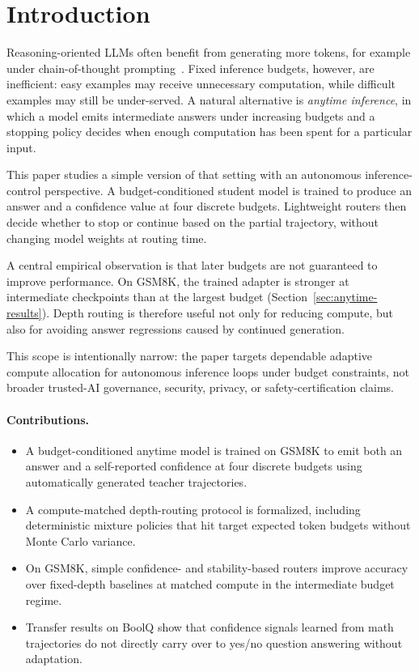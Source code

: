 \documentclass[conference]{IEEEtran}
\begin{document}
\section{Introduction}
Reasoning-oriented LLMs often benefit from generating more tokens, for example under chain-of-thought prompting~\cite{wei2022cot}. Fixed inference budgets, however, are inefficient: easy examples may receive unnecessary computation, while difficult examples may still be under-served. A natural alternative is \emph{anytime inference}, in which a model emits intermediate answers under increasing budgets and a stopping policy decides when enough computation has been spent for a particular input.

This paper studies a simple version of that setting with an autonomous inference-control perspective. A budget-conditioned student model is trained to produce an answer and a confidence value at four discrete budgets. Lightweight routers then decide whether to stop or continue based on the partial trajectory, without changing model weights at routing time.

A central empirical observation is that later budgets are not guaranteed to improve performance. On GSM8K, the trained adapter is stronger at intermediate checkpoints than at the largest budget (Section~\ref{sec:anytime-results}). Depth routing is therefore useful not only for reducing compute, but also for avoiding answer regressions caused by continued generation.

This scope is intentionally narrow: the paper targets dependable adaptive compute allocation for autonomous inference loops under budget constraints, not broader trusted-AI governance, security, privacy, or safety-certification claims.

\paragraph{Contributions.}
\begin{itemize}
  \item A budget-conditioned anytime model is trained on GSM8K to emit both an answer and a self-reported confidence at four discrete budgets using automatically generated teacher trajectories.
  \item A compute-matched depth-routing protocol is formalized, including deterministic mixture policies that hit target expected token budgets without Monte Carlo variance.
  \item On GSM8K, simple confidence- and stability-based routers improve accuracy over fixed-depth baselines at matched compute in the intermediate budget regime.
  \item Transfer results on BoolQ show that confidence signals learned from math trajectories do not directly carry over to yes/no question answering without adaptation.
\end{itemize}
\end{document}
